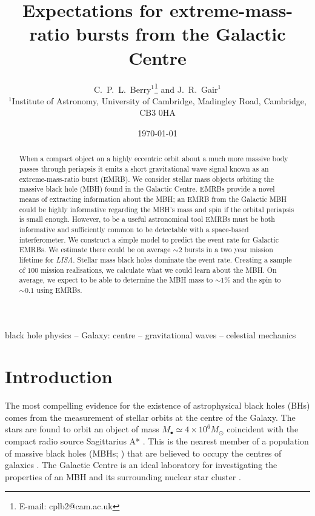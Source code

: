 \documentclass[useAMS,usedcolumn,usegraphicx,usenatbib]{mn2e}
\title[Expectations for EMRBs from the GC]{Expectations for extreme-mass-ratio bursts from the Galactic Centre}
\author[C.\ P.\ L.\ Berry and J.\ R.\ Gair]{C.\ P.\ L.\ Berry$^{1}$\thanks{E-mail:
cplb2@cam.ac.uk} and J.\ R.\ Gair$^{1}$\\
$^{1}$Institute of Astronomy, University of Cambridge, Madingley Road, Cambridge, CB3 0HA}
\begin{document}
\date{\today}

\pagerange{\pageref{firstpage}--\pageref{lastpage}} 

\maketitle

\label{firstpage}

\begin{abstract}
When a compact object on a highly eccentric orbit about a much more massive body passes through periapsis it emits a short gravitational wave signal known as an extreme-mass-ratio burst (EMRB). We consider stellar mass objects orbiting the massive black hole (MBH) found in the Galactic Centre. EMRBs provide a novel means of extracting information about the MBH; an EMRB from the Galactic MBH could be highly informative regarding the MBH's mass and spin if the orbital periapsis is small enough. However, to be a useful astronomical tool EMRBs must be both informative and sufficiently common to be detectable with a space-based interferometer. We construct a simple model to predict the event rate for Galactic EMRBs. We estimate there could be on average $\sim 2$ bursts in a two year mission lifetime for {\textit{LISA}}. Stellar mass black holes dominate the event rate. Creating a sample of $100$ mission realisations, we calculate what we could learn about the MBH. On average, we expect to be able to determine the MBH mass to $\sim1\%$ and the spin to $\sim0.1$ using EMRBs.
\end{abstract}

\begin{keywords}
black hole physics -- Galaxy: centre -- gravitational waves -- celestial mechanics
\end{keywords}

\section{Introduction}

The most compelling evidence for the existence of astrophysical black holes (BHs) comes from the measurement of stellar orbits at the centre of the Galaxy. The stars are found to orbit an object of mass $M_\bullet \simeq 4 \times 10^6 M_\odot$ coincident with the compact radio source Sagittarius A* \citep{Reid2004, Ghez2008, Gillessen2009, Meyer2012}. This is the nearest member of a population of massive black holes (MBHs; \citealt{Volonteri2010}) that are believed to occupy the centres of galaxies \citep{Lynden-Bell1969, Rees1984, Ferrarese2005}. The Galactic Centre is an ideal laboratory for investigating the properties of an MBH and its surrounding nuclear star cluster \citep{Genzel2010}.
\end{document}
